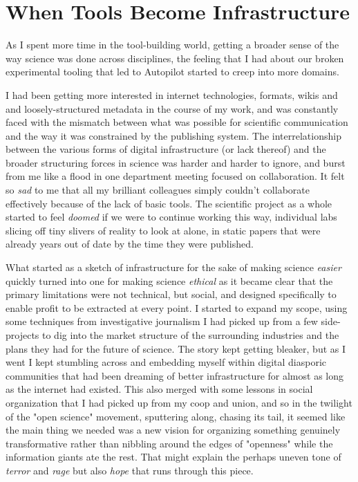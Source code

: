 \chapter*{When Tools Become Infrastructure}

As I spent more time in the tool-building world, getting a broader sense of the way science was done across disciplines, the feeling that I had about our broken experimental tooling that led to Autopilot started to creep into more domains. 

I had been getting more interested in internet technologies, formats, wikis and and loosely-structured metadata in the course of my work, and was constantly faced with the mismatch between what was possible for scientific communication and the way it was constrained by the publishing system. The interrelationship between the various forms of digital infrastructure (or lack thereof) and the broader structuring forces in science was harder and harder to ignore, and burst from me like a flood in one department meeting focused on collaboration. It felt so \textit{sad} to me that all my brilliant colleagues simply couldn't collaborate effectively because of the lack of basic tools. The scientific project as a whole started to feel \textit{doomed} if we were to continue working this way, individual labs slicing off tiny slivers of reality to look at alone, in static papers that were already years out of date by the time they were published. 

What started as a sketch of infrastructure for the sake of making science \textit{easier} quickly turned into one for making science \textit{ethical} as it became clear that the primary limitations were not technical, but social, and designed specifically to enable profit to be extracted at every point. I started to expand my scope, using some techniques from investigative journalism I had picked up from a few side-projects to dig into the market structure of the surrounding industries and the plans they had for the future of science. The story kept getting bleaker, but as I went I kept stumbling across and embedding myself within digital diasporic communities that had been dreaming of better infrastructure for almost as long as the internet had existed. This also merged with some lessons in social organization that I had picked up from my coop and union, and so in the twilight of the "open science" movement, sputtering along, chasing its tail, it seemed like the main thing we needed was a new vision for organizing something genuinely transformative rather than nibbling around the edges of "openness" while the information giants ate the rest. That might explain the perhaps uneven tone of \textit{terror} and \textit{rage} but also \textit{hope} that runs through this piece. 

